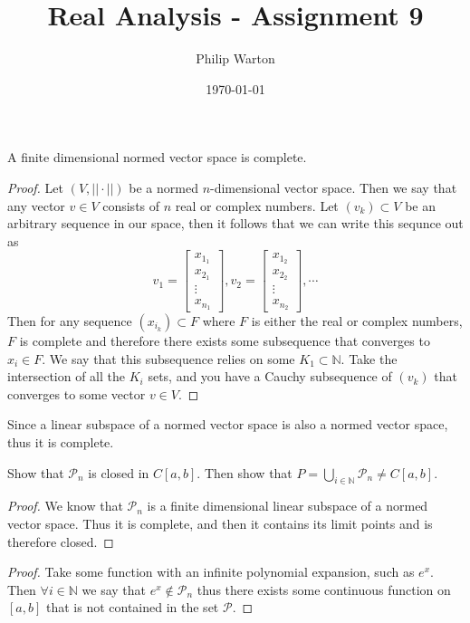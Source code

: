 \documentclass{article}
\theoremstyle{definition}
\begin{document}
\title{Real Analysis - Assignment 9}
\author{Philip Warton}
\date{\today}
\maketitle
\begin{mdframed}
    A finite dimensional normed vector space is complete.
\end{mdframed}
\begin{proof}
    Let $(V, ||\cdot ||)$ be a normed $n$-dimensional vector space. Then we say that any vector $v\in V$ consists
    of $n$ real or complex numbers. Let $(v_k) \subset V$ be an arbitrary sequence in our space, then it follows that 
    we can write this sequnce out as
    \[
        v_1 = \begin{bmatrix}
            x_{1_1}\\x_{2_1}\\ \vdots \\ x_{n_1}
        \end{bmatrix}, v_2 = \begin{bmatrix}
            x_{1_2}\\x_{2_2} \\ \vdots \\ x_{n_2}
        \end{bmatrix}, \cdots
    \]
    Then for any sequence $(x_{i_k}) \subset F$ where $F$ is either the real or complex numbers, $F$ is complete and 
    therefore there exists some subsequence that converges to $x_i \in F$. We say that this subsequence relies on some $K_1 \subset \mathbb{N}$.
    Take the intersection of all the $K_i$ sets, and you have a Cauchy subsequence of $(v_k)$ that converges to some vector $v \in V$.
\end{proof}
Since a linear subspace of a normed vector space is also a normed vector space, thus it is complete.
\begin{mdframed}
    Show that $\mathcal{P}_n$ is closed in $C[a,b]$. Then show that $P = \bigcup_{i \in \mathbb{N}}\mathcal{P}_n \neq C[a,b]$.
\end{mdframed}
\begin{proof}
    We know that $\mathcal{P}_n$ is a finite dimensional linear subspace of a normed vector space. Thus it is complete, and
    then it contains its limit points and is therefore closed.
\end{proof}
\begin{proof}
    Take some function with an infinite polynomial expansion, such as $e^x$. Then $\forall i \in \mathbb{N}$ we say that 
    $e^x \notin \mathcal{P}_n$ thus there exists some continuous function on $[a,b]$ that is not contained in the set $\mathcal{P}$.
\end{proof}
\end{document}
